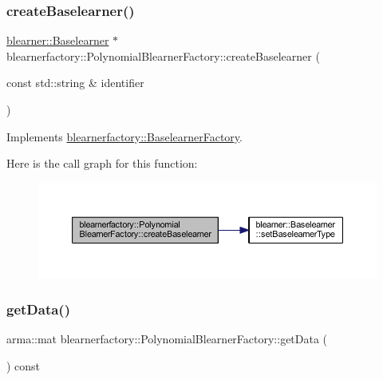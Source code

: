 \subsubsection{\texorpdfstring{create\+Baselearner()}{createBaselearner()}}
{\footnotesize\ttfamily \mbox{\hyperlink{classblearner_1_1_baselearner}{blearner\+::\+Baselearner}} $\ast$ blearnerfactory\+::\+Polynomial\+Blearner\+Factory\+::create\+Baselearner (\begin{DoxyParamCaption}\item[{const std\+::string \&}]{identifier }\end{DoxyParamCaption})\hspace{0.3cm}{\ttfamily [virtual]}}



Implements \mbox{\hyperlink{classblearnerfactory_1_1_baselearner_factory_ac3584a20a84834099a15908690b837bb}{blearnerfactory\+::\+Baselearner\+Factory}}.

Here is the call graph for this function\+:\nopagebreak
\begin{figure}[H]
\begin{center}
\leavevmode
\includegraphics[width=350pt]{classblearnerfactory_1_1_polynomial_blearner_factory_ac0c7f742da0a2de444e91a0cfb0a9384_cgraph}
\end{center}
\end{figure}
\mbox{\label{classblearnerfactory_1_1_polynomial_blearner_factory_addce36fbb590b2cd3d9325b53ae74566}} 
\subsubsection{\texorpdfstring{get\+Data()}{getData()}}
{\footnotesize\ttfamily arma\+::mat blearnerfactory\+::\+Polynomial\+Blearner\+Factory\+::get\+Data (\begin{DoxyParamCaption}{ }\end{DoxyParamCaption}) const\hspace{0.3cm}{\ttfamily [virtual]}}



